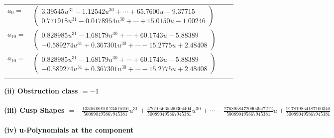 \documentclass[1p]{elsarticle_modified}
\theoremstyle{definition}
\begin{document}
\begin{tabular}{m{7pt} m{180pt} m{7pt} m{180pt} }
\flushright $a_{9}=$&$\begin{pmatrix}3.39545 u^{31}-1.12542 u^{30}+\cdots+65.7600 u-9.37715\\0.771918 u^{31}-0.0178954 u^{30}+\cdots+15.0150 u-1.00246\end{pmatrix}$ \\
\flushright $a_{10}=$&$\begin{pmatrix}0.828985 u^{31}-1.68179 u^{30}+\cdots+60.1743 u-5.88389\\-0.589274 u^{31}+0.367301 u^{30}+\cdots-15.2775 u+2.48408\end{pmatrix}$\\ \flushright $a_{10}=$&$\begin{pmatrix}0.828985 u^{31}-1.68179 u^{30}+\cdots+60.1743 u-5.88389\\-0.589274 u^{31}+0.367301 u^{30}+\cdots-15.2775 u+2.48408\end{pmatrix}$\\&\end{tabular}
\flushleft \textbf{(ii) Obstruction class $= -1$}\\~\\
\flushleft \textbf{(iii) Cusp Shapes $= -\frac{1330608910123401616}{500890495867945381} u^{31}+\frac{476105635560304404}{500890495867945381} u^{30}+\cdots-\frac{27689584720904947212}{500890495867945381} u+\frac{917819854187100340}{500890495867945381}$}\\~\\
\newpage\renewcommand{\arraystretch}{1}
\flushleft \textbf{(iv) u-Polynomials at the component}\newline \\
\end{document}

